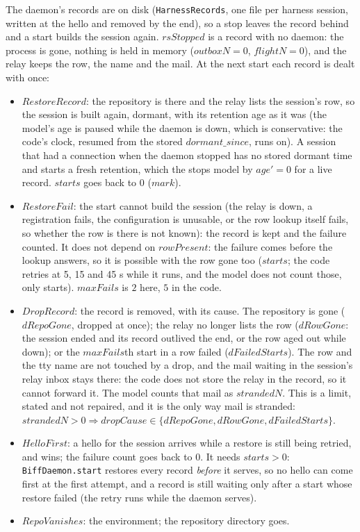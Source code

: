 \documentclass[a4paper,10pt,fleqn]{article}
\begin{document}
The daemon's records are on disk (\texttt{HarnessRecords}, one file per harness session, written
at the hello and removed by the end), so a stop leaves the record behind and a start builds the
session again.  $rsStopped$ is a record with no daemon: the process is gone, nothing is held
in memory ($outboxN = 0$, $flightN = 0$), and the relay keeps the row, the name and the mail.
At the next start each record is dealt with once:

\begin{itemize}
  \item $RestoreRecord$: the repository is there and the relay lists the session's row, so the
    session is built again, dormant, with its retention age as it was (the model's age is
    paused while the daemon is down, which is conservative: the code's clock, resumed from the
    stored $dormant\_since$, runs on).  A session that had a connection when the daemon stopped
    has no stored dormant time and starts a fresh retention, which the stops model by
    $age' = 0$ for a live record.  $starts$ goes back to $0$ ($mark$).
  \item $RestoreFail$: the start cannot build the session (the relay is down, a registration
    fails, the configuration is unusable, or the row lookup itself fails, so whether the row is
    there is not known): the record is kept and the failure counted.  It does not depend on
    $rowPresent$: the failure comes before the lookup answers, so it is possible with the row gone too
    ($starts$; the code retries at 5, 15 and 45 s while it runs, and the model does not
    count those, only starts).  $maxFails$ is $2$ here, $5$ in the code.
  \item $DropRecord$: the record is removed, with its cause.  The repository is gone
    ($dRepoGone$, dropped at once); the relay no longer lists the row ($dRowGone$: the session
    ended and its record outlived the end, or the row aged out while down); or the
    $maxFails$th start in a row failed ($dFailedStarts$).  The row and the tty name are not
    touched by a drop, and the mail waiting in the session's relay inbox stays there: the code
    does not store the relay in the record, so it cannot forward it.  The model counts that
    mail as $strandedN$.  This is a limit, stated and not repaired, and it is the only way mail
    is stranded: $strandedN > 0 \Rightarrow dropCause \in \{ dRepoGone, dRowGone,
    dFailedStarts \}$.
  \item $HelloFirst$: a hello for the session arrives while a restore is still being retried, and
    wins; the failure count goes back to $0$.  It needs $starts > 0$: \texttt{BiffDaemon.start} restores
    every record \emph{before} it serves, so no hello can come first at the first attempt, and a
    record is still waiting only after a start whose restore failed (the retry runs while the
    daemon serves).
  \item $RepoVanishes$: the environment; the repository directory goes.
\end{itemize}
\end{document}

